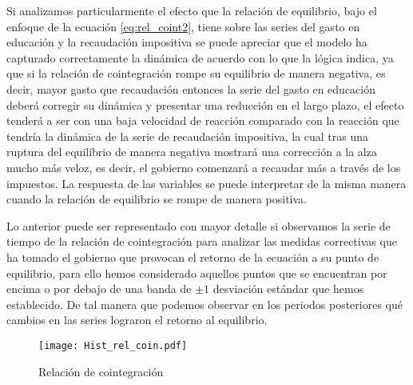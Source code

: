 Si analizamos particularmente el efecto que la relación de equilibrio, bajo el enfoque de la ecuación \ref{eq:rel_coint2}, tiene sobre las series del gasto en educación y la recaudación impositiva se puede apreciar que el modelo ha capturado correctamente la dinámica de acuerdo con lo que la lógica indica, ya que si la relación de cointegración rompe su equilibrio de manera negativa, es decir, mayor gasto que recaudación entonces la serie del gasto en educación deberá corregir su dinámica y presentar una reducción en el largo plazo, el efecto tenderá a ser con una baja velocidad de reacción comparado con la reacción que tendría la dinámica de la serie de recaudación impositiva, la cual tras una ruptura del equilibrio de manera negativa mostrará una corrección a la alza mucho más veloz, es decir, el gobierno comenzará a recaudar más a través de los impuestos. La respuesta de las variables se puede interpretar de la misma manera cuando la relación de equilibrio se rompe de manera positiva.

Lo anterior puede ser representado con mayor detalle si observamos la serie de tiempo de la relación de cointegración para analizar las medidas correctivas que ha tomado el gobierno que provocan el retorno de la ecuación a su punto de equilibrio, para ello hemos considerado aquellos puntos que se encuentran por encima o por debajo de una banda de $\pm 1$ desviación estándar que hemos establecido. De tal manera que podemos observar en los periodos posteriores qué cambios en las series lograron el retorno al equilibrio.

\begin{figure}[H]
\centering
\texttt{[image: Hist\_rel\_coin.pdf]}
\caption{Relación de cointegración}
\label{hist_rel_coint}
\end{figure}



